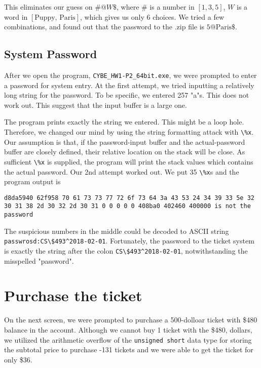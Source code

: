 \documentclass[11pt]{article}
\begin{document}
This eliminates our guess on $\#@W\$$, where \# is a number in $[1, 3, 5]$, $W$ is a word in $[\text{Puppy, Paris}]$, which gives us only 6 choices. We tried a few combinations, and found out that the password to the .zip file is $\text{5@Paris\$}$.

\subsection{System Password}\label{syspw}

After we open the program, \lstinline{CYBE_HW1-P2_64bit.exe}, we were prompted to enter a password for system entry. At the first attempt, we tried inputting a relatively long string for the password. To be specific, we entered 257 "a"s. This does not work out. This suggest that the input buffer is a large one. 

The program prints exactly the string we entered. This might be a loop hole. Therefore, we changed our mind by using the string formatting attack with \lstinline{\%x}. Our assumption is that, if the password-input buffer and the actual-password buffer are closely defined, their relative location on the stack will be close. As sufficient \lstinline{\%x} is supplied, the program will print the stack values which contains the actual password. Our 2nd attempt worked out. We put 35 \lstinline{\%x}s and the program output is
\begin{lstlisting}
d8da5940 62f958 70 61 73 73 77 72 6f 73 64 3a 43 53 24 34 39 33 5e 32 30 31 38 2d 30 32 2d 30 31 0 0 0 0 0 408ba0 402460 400000 is not the password
\end{lstlisting}
The suspicious numbers in the middle could be decoded to ASCII string \lstinline{passwrosd:CS\$493^2018-02-01}. Fortunately, the password to the ticket system is exactly the string after the colon \lstinline{CS\$493^2018-02-01}, notwithstanding the misspelled "password". 

\section{Purchase the ticket}\label{purticket}

On the next screen, we were prompted to purchase a 500-dolloar ticket with \$480 balance in the account. Although we cannot buy 1 ticket with the \$480, dollars, we utilized the arithmetic overflow of the \lstinline{unsigned short} data type for storing the subtotal price to purchase -131 tickets and we were able to get the ticket for only \$36.
\end{document}
